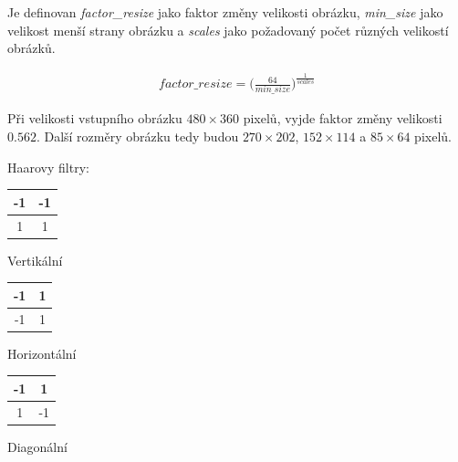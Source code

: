 \documentclass[czech,BP]{thesiskiv}
\begin{document}
\par Je definovan \textit{factor\_resize} jako faktor změny velikosti obrázku, \textit{min\_size} jako velikost menší strany obrázku a \textit{scales} jako požadovaný počet různých velikostí obrázků. 

\begin{align}
   \label{Haar_factor_resize} factor\_resize = \Bigg(\frac{64}{min\_size}\Bigg)^{\frac{1}{scales}}   
\end{align}

\par Při velikosti vstupního obrázku $480 \times 360$ pixelů, vyjde faktor změny velikosti $0.562$. Další rozměry obrázku tedy budou $270 \times 202$, $152 \times 114 $ a $85 \times 64$ pixelů.


\vspace{0.5cm}
\noindent Haarovy filtry: 

\begin{multicols}{3}
	\begin{center}
		\begin{tabular}{ | c | c | }
    		\hline
    		\cellcolor{ashgrey!50}-1 & \cellcolor{ashgrey!50}-1 \\ \hline
    		1 & 1 \\ 
    		\hline
    	\end{tabular}
    	\vspace{0.5cm}
    	\par Vertikální
	\end{center}
	\begin{center}
		\begin{tabular}{ | c | c | }
    		\hline
    		\cellcolor{ashgrey!50}-1 & 1 \\ \hline
    		\cellcolor{ashgrey!50}-1 & 1 \\ 
    		\hline
    	\end{tabular}
		\vspace{0.5cm}
    	\par Horizontální
	\end{center} 	
	\begin{center}
		\begin{tabular}{ | c | c | }
    		\hline
    		\cellcolor{ashgrey!50}-1 & 1 \\ \hline
    		1 & \cellcolor{ashgrey!50}-1 \\ 
    		\hline
    	\end{tabular}
		\vspace{0.5cm}
    	\par Diagonální
	\end{center} 	
\end{multicols}
\end{document}
